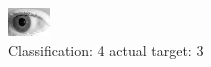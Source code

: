 \begin{figure}[h!]
\begin{center}
\includegraphics[width=0.60\columnwidth]{figures/ID312_class_4_target_3.png}
\end{center}
\caption{ Classification: 4 actual target: 3}
\label{fig:ID312_class_4_target_3}
\end{figure}
